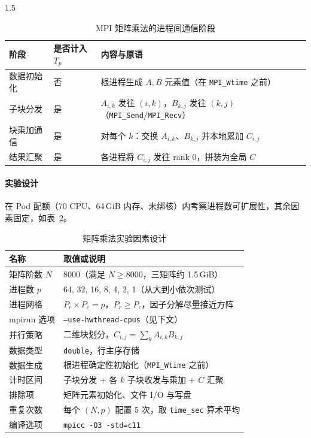 \documentclass[zihao=-4]{ctexart}
\begin{document}
\begin{spacing}{1.5}
\begin{table}[H]
\small
\centering
\caption{MPI 矩阵乘法的进程间通信阶段}
\label{tab:mpi-comm}
\begin{tabular}{llp{5.8cm}}
\toprule
阶段 & 是否计入 \(T_p\) & 内容与原语 \\
\midrule
数据初始化 & 否 & 根进程生成 \(A,B\) 元素值（在 \texttt{MPI\_Wtime} 之前） \\
子块分发 & 是 & \(A_{i,k}\) 发往 \((i,k)\)，\(B_{k,j}\) 发往 \((k,j)\)（\texttt{MPI\_Send}/\texttt{MPI\_Recv}） \\
块乘加通信 & 是 & 对每个 \(k\)：交换 \(A_{i,k}\)、\(B_{k,j}\) 并本地累加 \(C_{i,j}\) \\
结果汇聚 & 是 & 各进程将 \(C_{i,j}\) 发往 rank 0，拼装为全局 \(C\) \\
\bottomrule
\end{tabular}
\end{table}

\paragraph{实验设计}
在 Pod 配额（70 CPU、64\,GiB 内存、未绑核）内考察进程数可扩展性，其余因素固定，如表~\ref{tab:exp-design}。

\begin{table}[H]
\small
\centering
\caption{矩阵乘法实验因素设计}
\label{tab:exp-design}
\begin{tabular}{ll}
\toprule
名称 & 取值或说明 \\
\midrule
矩阵阶数 \(N\) & 8000（满足 \(N\ge 8000\)，三矩阵约 1.5\,GiB） \\
进程数 \(p\) & 64, 32, 16, 8, 4, 2, 1（从大到小依次测试） \\
进程网格 & \(P_r\times P_c=p\)，\(P_r\ge P_c\)，因子分解尽量接近方阵 \\
mpirun 选项 & \texttt{--use-hwthread-cpus}（见下文） \\
并行策略 & 二维块划分，\(C_{i,j}=\sum_k A_{i,k}B_{k,j}\) \\
数据类型 & \texttt{double}，行主序存储 \\
数据生成 & 根进程确定性初始化（\texttt{MPI\_Wtime} 之前） \\
计时区间 & 子块分发 + 各 \(k\) 子块收发与乘加 + \(C\) 汇聚 \\
排除项 & 矩阵元素初始化、文件 I/O 与写盘 \\
重复次数 & 每个 \((N,p)\) 配置 5 次，取 \texttt{time\_sec} 算术平均 \\
编译选项 & \texttt{mpicc -O3 -std=c11} \\
\bottomrule
\end{tabular}
\end{table}


\end{spacing}
\end{document}
